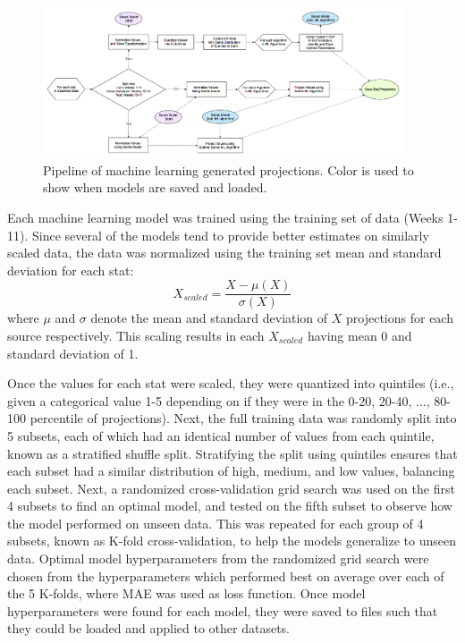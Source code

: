 \documentclass[12pt]{article}
\begin{document}
\begin{figure}[H]
  \centering
  \includegraphics[width=0.95\textwidth]{../figures/ML_flowchart}
  \caption{Pipeline of machine learning generated projections. Color is used to show when models are saved and loaded.}
  \label{ML pipeline}
\end{figure}

Each machine learning model was trained using the training set of data (Weeks 1-11). Since several of the models tend to provide better estimates on similarly scaled data, the data was normalized using the training set mean and standard deviation for each stat:
\begin{equation}
X_{scaled} = \dfrac{X - \mu (X)}{\sigma (X)}
\end{equation}
where $\mu$ and $\sigma$ denote the mean and standard deviation of $X$ projections for each source respectively. This scaling results in each $X_{scaled}$ having mean 0 and standard deviation of 1.\bigskip

Once the values for each stat were scaled, they were quantized into quintiles (i.e., given a categorical value 1-5 depending on if they were in the 0-20, 20-40, ..., 80-100 percentile of projections). Next, the full training data was randomly split into 5 subsets, each of which had an identical number of values from each quintile, known as a stratified shuffle split. Stratifying the split using quintiles ensures that each subset had a similar distribution of high, medium, and low values, balancing each subset. Next, a randomized cross-validation grid search was used on the first 4 subsets to find an optimal model, and tested on the fifth subset to observe how the model performed on unseen data. This was repeated for each group of 4 subsets, known as K-fold cross-validation, to help the models generalize to unseen data. Optimal model hyperparameters from the randomized grid search were chosen from the hyperparameters which performed best on average over each of the 5 K-folds, where MAE was used as loss function. Once model hyperparameters were found for each model, they were saved to files such that they could be loaded and applied to other datasets.\bigskip
\end{document}
